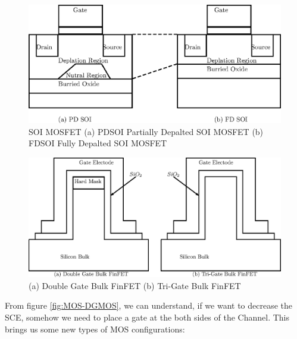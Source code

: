 \documentclass[a4paper]{article}
\begin{document}
\begin{figure}[h!]
  \includegraphics[scale=0.8]{./BulkFinFET-PD-FD-SOI.eps}
  \caption{SOI MOSFET (a) PDSOI Partially Depalted SOI MOSFET (b) FDSOI Fully Depalted SOI MOSFET}
  \label{fig:PDSOI-FDSOI}
\end{figure}

\begin{figure}[h!]
  \includegraphics[scale=0.8]{./BulkFinFET-FinFET.eps}
  \caption{(a) Double Gate Bulk FinFET (b) Tri-Gate Bulk FinFET}
  \label{fig:FinFET}
\end{figure}


From figure \ref {fig:MOS-DGMOS}, we can understand, if we want to decrease the SCE, somehow we need to place a gate at the both sides of the Channel. This brings us some new types of MOS configurations:
\end{document}
